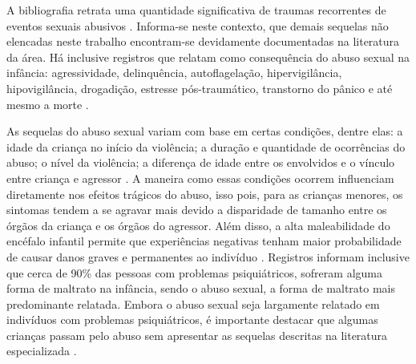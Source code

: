 \begin{parcolumns}[sloppy, distance=3em, colwidths={2=0.35\textwidth}]{2}
	\colplacechunks
	
	
	\colplacechunks
	
\end{parcolumns}

A bibliografia retrata uma quantidade significativa de traumas recorrentes de eventos sexuais abusivos \cite{OMS2003guidelines, mariscal2003programa, santos2011guia, pavao2013impasse, acuna2014abuso, deslandes2016atendimento}. Informa-se neste contexto, que demais sequelas não elencadas neste trabalho encontram-se devidamente documentadas na literatura da área. Há inclusive registros que relatam como consequência do abuso sexual na infância: agressividade, delinquência, autoflagelação, hipervigilância, hipovigilância, drogadição, estresse pós-traumático, transtorno do pânico e até mesmo a morte \cite{meurer2017direitos}. 

As sequelas do abuso sexual variam com base em certas condições, dentre elas: a idade da criança no início da violência; a duração e quantidade de ocorrências do abuso; o nível da violência; a diferença de idade entre os envolvidos e o vínculo entre criança e agressor \cite{florentino2015possiveis}. A maneira como essas condições ocorrem influenciam diretamente nos efeitos trágicos do abuso, isso pois, para as crianças menores, os sintomas tendem a se agravar mais devido a disparidade de tamanho entre os órgãos da criança e os órgãos do agressor. Além disso, a alta maleabilidade do encéfalo infantil permite que experiências negativas tenham maior probabilidade de causar danos graves e permanentes ao indivíduo \cite{pereira2011crescimento}. Registros informam inclusive que cerca de 90\% das pessoas com problemas psiquiátricos, sofreram alguma forma de maltrato na infância, sendo o abuso sexual, a forma de maltrato mais predominante relatada. Embora o abuso sexual seja largamente relatado em indivíduos com problemas psiquiátricos, é importante destacar que algumas crianças passam pelo abuso sem apresentar as sequelas descritas na literatura especializada \cite{aded2006abuso}. 

